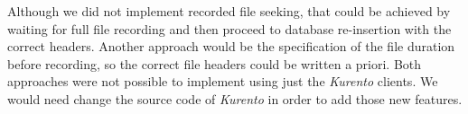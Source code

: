 	Although we did not implement recorded file seeking, that could be achieved by waiting for full file recording and then proceed to database re-insertion with the correct headers. Another approach would be the specification of the file duration before recording, so the correct file headers could be written a priori. Both approaches were not possible to implement using just the \emph{Kurento} clients. We would need change the source code of \emph{Kurento} in order to add those new features.
        




